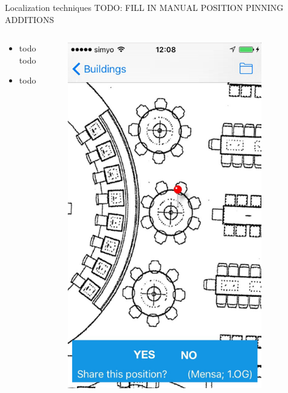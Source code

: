 \documentclass[11pt]{beamer}
\begin{document}
\begin{frame}[t]{Localization techniques}
  TODO: FILL IN MANUAL POSITION PINNING ADDITIONS
  \begin{columns}[t]
    \begin{column}[b]{0.7\textwidth}
      \begin{itemize}
        \setlength{\itemsep}{1pt}
        \setlength{\parskip}{0pt}
        \setlength{\parsep}{0pt}
        \item todo todo
        \item todo
      \end{itemize}
    \end{column}
    \hfill
    \begin{column}{0.3\textwidth}
      \includegraphics[width=0.8\textwidth]{mappinpointawithoutborder}%
    \end{column}
  \end{columns}

\end{frame}
\end{document}
